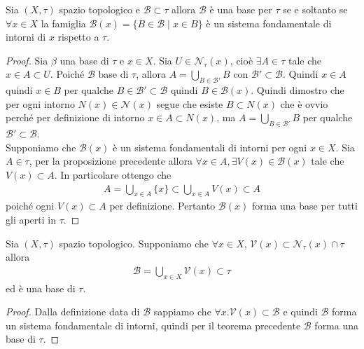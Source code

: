 \begin{theorem}
	Sia $(X,\tau)$ spazio topologico e $\mathcal{B} \subset \tau$ allora $\mathcal{B}$ è una base per $\tau$ se e soltanto se $\forall x \in X$ la famiglia $\mathcal{B}(x) = \{B \in \mathcal{B} \; | \; x \in B \}$ è un sistema fondamentale di intorni di $x$ rispetto a $\tau$.
\end{theorem}
\begin{proof}
	Sia $\beta$ una base di $\tau$ e $x \in X$. Sia $U \in \mathcal{N}_\tau(x)$, cioè $\exists A \in \tau$ tale che $x \in A \subset U$. Poiché $\mathcal{B}$ base di $\tau$, allora $A = \bigcup_{B \in \mathcal{B}'} B$ con $\mathcal{B}' \subset \mathcal{B}$. Quindi $x \in A$ quindi $x \in B$ per qualche $B \in \mathcal{B}' \subset \mathcal{B}$ quindi $B \in \mathcal{B}(x)$. Quindi dimostro che per ogni intorno $N(x) \in \mathcal{N}(x)$ segue che esiste $B \subset N(x)$ che è ovvio perché per definizione di intorno $x \in A \subset N(x)$, ma $A = \bigcup_{B \in \mathcal{B}'} B$ per qualche $\mathcal{B}' \subset \mathcal{B}$.\\  
	
	Supponiamo che $\mathcal{B}(x)$ è un sistema fondamentali di intorni per ogni $x \in X$. Sia $A \in \tau$, per la proposizione precedente allora $\forall x \in A, \exists V(x) \in \mathcal{B}(x)$ tale che $V(x) \subset A$. In particolare ottengo che
	\begin{equation}
	\begin{aligned}
		A = \bigcup_{x \in A} \{x\} \subset \bigcup_{x \in A} V(x) \subset A
	\end{aligned}
	\end{equation} 
	poiché ogni $V(x) \subset A$ per definizione. Pertanto $\mathcal{B}(x)$ forma una base per tutti gli aperti in $\tau$.
\end{proof}

\begin{corollary}
	\label{crl:base_from_sfi}
	Sia $(X,\tau)$ spazio topologico. Supponiamo che $\forall x \in X$, $\mathcal{V}(x) \subset \mathcal{N}_\tau(x) \cap \tau$ allora 
	\begin{equation}
	\begin{aligned}
		\mathcal{B} = \bigcup_{x \in X} \mathcal{V}(x) \subset \tau
	\end{aligned}
	\end{equation}
	ed è una base di $\tau$.
\end{corollary}
\begin{proof}
	Dalla definizione data di $\mathcal{B}$ sappiamo che $\forall x . \mathcal{V}(x) \subset \mathcal{B}$ e quindi $\mathcal{B}$ forma un sistema fondamentale di intorni, quindi per il teorema precedente $\mathcal{B}$ forma una base di $\tau$.
\end{proof}

